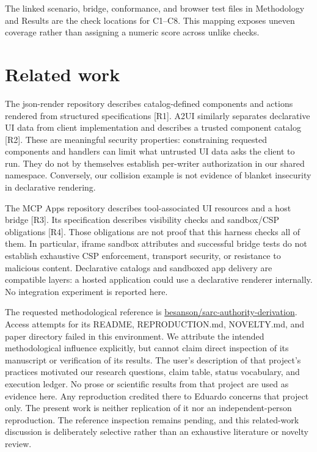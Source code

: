 \documentclass[11pt]{article}
\begin{document}
The linked scenario, bridge, conformance, and browser test files in
Methodology and Results are the check locations for C1--C8. This mapping
exposes uneven coverage rather than assigning a numeric score across
unlike checks.

\section{Related work}\label{related-work}

The json-render repository describes catalog-defined components and
actions rendered from structured specifications {[}R1{]}. A2UI similarly
separates declarative UI data from client implementation and describes a
trusted component catalog {[}R2{]}. These are meaningful security
properties: constraining requested components and handlers can limit
what untrusted UI data asks the client to run. They do not by themselves
establish per-writer authorization in our shared namespace. Conversely,
our collision example is not evidence of blanket insecurity in
declarative rendering.

The MCP Apps repository describes tool-associated UI resources and a
host bridge {[}R3{]}. Its specification describes visibility checks and
sandbox/CSP obligations {[}R4{]}. Those obligations are not proof that
this harness checks all of them. In particular, iframe sandbox
attributes and successful bridge tests do not establish exhaustive CSP
enforcement, transport security, or resistance to malicious content.
Declarative catalogs and sandboxed app delivery are compatible layers: a
hosted application could use a declarative renderer internally. No
integration experiment is reported here.

The requested methodological reference is
\href{https://github.com/besanson/sarc-authority-derivation}{besanson/sarc-authority-derivation}.
Access attempts for its README, REPRODUCTION.md, NOVELTY.md, and paper
directory failed in this environment. We attribute the intended
methodological influence explicitly, but cannot claim direct inspection
of its manuscript or verification of its results. The user's description
of that project's practices motivated our research questions, claim
table, status vocabulary, and execution ledger. No prose or scientific
results from that project are used as evidence here. Any reproduction
credited there to Eduardo concerns that project only. The present work
is neither replication of it nor an independent-person reproduction. The
reference inspection remains pending, and this related-work discussion
is deliberately selective rather than an exhaustive literature or
novelty review.
\end{document}
